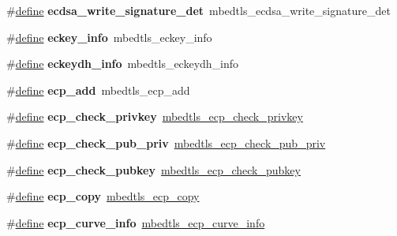 \begin{DoxyCompactItemize}
\mbox{\label{compat-1_83_8h_ad02313b5535aef614d44f471c964e5c0}} 
\#\hyperlink{structdefine}{define} {\bfseries ecdsa\+\_\+write\+\_\+signature\+\_\+det}~mbedtls\+\_\+ecdsa\+\_\+write\+\_\+signature\+\_\+det
\item 
\mbox{\label{compat-1_83_8h_a059105244e0fe117c1d0d766316c77d0}} 
\#\hyperlink{structdefine}{define} {\bfseries eckey\+\_\+info}~mbedtls\+\_\+eckey\+\_\+info
\item 
\mbox{\label{compat-1_83_8h_af314b15757b8873a04140131b10bff2c}} 
\#\hyperlink{structdefine}{define} {\bfseries eckeydh\+\_\+info}~mbedtls\+\_\+eckeydh\+\_\+info
\item 
\mbox{\label{compat-1_83_8h_aaf65505bb377657d210672d3f6d57795}} 
\#\hyperlink{structdefine}{define} {\bfseries ecp\+\_\+add}~mbedtls\+\_\+ecp\+\_\+add
\item 
\mbox{\label{compat-1_83_8h_a89535c11fa0b06760215628ccafc08d9}} 
\#\hyperlink{structdefine}{define} {\bfseries ecp\+\_\+check\+\_\+privkey}~\hyperlink{ecp_8h_a5eefe5e5381076f95dbc8c6779f4da4e}{mbedtls\+\_\+ecp\+\_\+check\+\_\+privkey}
\item 
\mbox{\label{compat-1_83_8h_ac5d1704477d3813275c81e9f9e6b59ce}} 
\#\hyperlink{structdefine}{define} {\bfseries ecp\+\_\+check\+\_\+pub\+\_\+priv}~\hyperlink{ecp_8h_a5718c919b1ad1bf86ce4d45613f06e55}{mbedtls\+\_\+ecp\+\_\+check\+\_\+pub\+\_\+priv}
\item 
\mbox{\label{compat-1_83_8h_af2e06abdb03d22b0cdf3faf600ba472c}} 
\#\hyperlink{structdefine}{define} {\bfseries ecp\+\_\+check\+\_\+pubkey}~\hyperlink{ecp_8h_ae8768744c65fc71137b496f10cc02370}{mbedtls\+\_\+ecp\+\_\+check\+\_\+pubkey}
\item 
\mbox{\label{compat-1_83_8h_a0ea7a216bb21c7c5348261f8374a463e}} 
\#\hyperlink{structdefine}{define} {\bfseries ecp\+\_\+copy}~\hyperlink{ecp_8h_a97cfab220125dd40d96344e441656142}{mbedtls\+\_\+ecp\+\_\+copy}
\item 
\mbox{\label{compat-1_83_8h_ad32e7b2fedec9d5f3588afe875516d00}} 
\#\hyperlink{structdefine}{define} {\bfseries ecp\+\_\+curve\+\_\+info}~\hyperlink{structmbedtls__ecp__curve__info}{mbedtls\+\_\+ecp\+\_\+curve\+\_\+info}

\end{DoxyCompactItemize}
